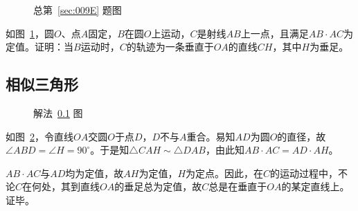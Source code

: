 

\begin{figure}[htbp]
  \centering
  \caption{总第~\ref{sec:009E} 题图} \label{fig:009E}
\end{figure}

如图~\ref{fig:009E}，圆$O$、点$A$固定，$B$在圆$O$上运动，$C$是射线$AB$上一点，且满足$AB \cdot AC$为定值。证明：当$B$运动时，$C$的轨迹为一条垂直于$OA$的直线$CH$，其中$H$为垂足。

\subsection{相似三角形} \label{subsec:009E-sim}

\begin{figure}[htbp]
  \centering
  \caption{解法~\ref{subsec:009E-sim} 图} \label{fig:009E-sim}
\end{figure}

如图~\ref{fig:009E-sim}，令直线$OA$交圆$O$于点$D$，$D$不与$A$重合。易知$AD$为圆$O$的直径，故$\angle ABD = \angle H = 90^\circ$。于是知$\triangle CAH \sim \triangle DAB$，由此知$AB \cdot AC = AD \cdot AH$。

$AB \cdot AC$与$AD$均为定值，故$AH$为定值，$H$为定点。因此，在$C$的运动过程中，不论$C$在何处，其到直线$OA$的垂足总为定值，故$C$总是在垂直于$OA$的某定直线上。证毕。
